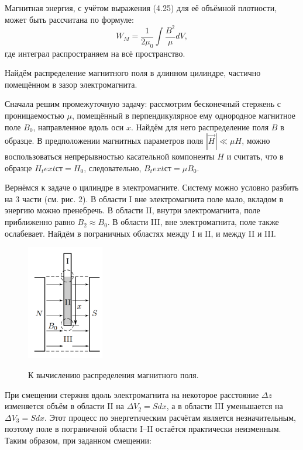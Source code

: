 \documentclass[12pt,a4paper]{article}
\begin{document}
Магнитная энергия, с учётом выражения (4.25) для её объёмной плотности, может быть рассчитана по формуле:
\[
W_M = \frac{1}{2 \mu_0} \int \frac{B^2}{\mu} dV, \tag{2}
\]
где интеграл распространяем на всё пространство.

Найдём распределение магнитного поля в длинном цилиндре, частично помещённом в зазор электромагнита.

Сначала решим промежуточную задачу: рассмотрим бесконечный стержень с проницаемостью \(\mu\), помещённый в перпендикулярное ему однородное магнитное поле \(B_0\), направленное вдоль оси \(x\). Найдём для него распределение поля \(B\) в образце. В предположении магнитных параметров поля \(|\vec{H}| \ll \mu H\), можно воспользоваться непрерывностью касательной компоненты \(H\) и считать, что в образце \(H_text{ст} = H_0\), следовательно, \(B_text{ст} = \mu B_0\).

Вернёмся к задаче о цилиндре в электромагните. Систему можно условно разбить на 3 части (см. рис. 2). В области I вне электромагнита поле мало, вкладом в энергию можно пренебречь. В области II, внутри электромагнита, поле приближенно равно \(B_2 \approx B_0\). В области III, вне электромагнита, поле также ослабевает. Найдём в пограничных областях между I и II, и между II и III.

\begin{figure}[h!]
	\begin{center}
		\includegraphics[width = 0.3\textwidth]{image2.png}
		
		\label{fig:facility}
        \caption{К вычислению распределения магнитного поля.}
	\end{center}
\end{figure}

При смещении стержня вдоль электромагнита на некоторое расстояние \(\Delta z\) изменяется объём в области II на \(\Delta V_2 = S dx\), а в области III уменьшается на \(\Delta V_3 = S dx\). Этот процесс по энергетическим расчётам является незначительным, поэтому поле в пограничной области I–II остаётся практически неизменным. Таким образом, при заданном смещении:
\end{document}

